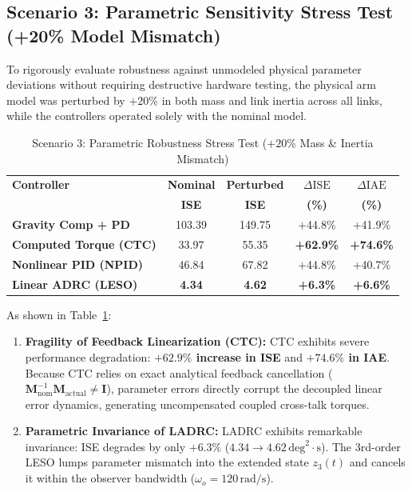 \documentclass[journal,10pt,twocolumn]{IEEEtran}
\begin{document}
\subsection{Scenario 3: Parametric Sensitivity Stress Test (+20\% Model Mismatch)}
To rigorously evaluate robustness against unmodeled physical parameter deviations without requiring destructive hardware testing, the physical arm model was perturbed by $+20\%$ in both mass and link inertia across all links, while the controllers operated solely with the nominal model.

\begin{table}[h]
\centering
\caption{Scenario 3: Parametric Robustness Stress Test ($+20\%$ Mass \& Inertia Mismatch)}
\label{tab:scenario3_results}
\begin{tabular}{lcccc}
\toprule
\textbf{Controller} & \textbf{Nominal} & \textbf{Perturbed} & \textbf{$\Delta\text{ISE}$} & \textbf{$\Delta\text{IAE}$} \\
& \textbf{ISE} & \textbf{ISE} & \textbf{(\%)} & \textbf{(\%)} \\
\midrule
\textbf{Gravity Comp + PD} & 103.39 & 149.75 & +44.8\% & +41.9\% \\
\textbf{Computed Torque (CTC)} & 33.97 & 55.35 & \textbf{+62.9\%} & \textbf{+74.6\%} \\
\textbf{Nonlinear PID (NPID)} & 46.84 & 67.82 & +44.8\% & +40.7\% \\
\textbf{Linear ADRC (LESO)} & \textbf{4.34} & \textbf{4.62} & \textbf{+6.3\%} & \textbf{+6.6\%} \\
\bottomrule
\end{tabular}
\end{table}

As shown in Table~\ref{tab:scenario3_results}:
\begin{enumerate}
    \item \textbf{Fragility of Feedback Linearization (CTC):} CTC exhibits severe performance degradation: \textbf{$+62.9\%$ increase in ISE} and \textbf{$+74.6\%$ in IAE}. Because CTC relies on exact analytical feedback cancellation ($\bm{M}_{\text{nom}}^{-1} \bm{M}_{\text{actual}} \neq \bm{I}$), parameter errors directly corrupt the decoupled linear error dynamics, generating uncompensated coupled cross-talk torques.
    \item \textbf{Parametric Invariance of LADRC:} LADRC exhibits remarkable invariance: ISE degrades by only \textbf{$+6.3\%$} ($4.34 \to 4.62\,\text{deg}^2\cdot\text{s}$). The 3rd-order LESO lumps parameter mismatch into the extended state $z_3(t)$ and cancels it within the observer bandwidth ($\omega_o = 120\,\text{rad/s}$).
\end{enumerate}
\end{document}
